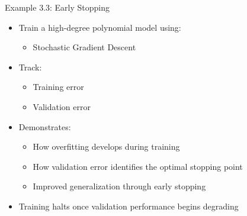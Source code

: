 \documentclass[aspectratio=169]{beamer}
\begin{document}
\begin{frame}{Example 3.3: Early Stopping}
	
	\begin{itemize}
		\item Train a high-degree polynomial model using:
		\begin{itemize}
			\item Stochastic Gradient Descent
		\end{itemize}
		
		\vspace{0.5em}
		
		\item Track:
		\begin{itemize}
			\item Training error
			\item Validation error
		\end{itemize}
		
		\vspace{0.5em}
		
		\item Demonstrates:
		\begin{itemize}
			\item How overfitting develops during training
			\item How validation error identifies the optimal stopping point
			\item Improved generalization through early stopping
		\end{itemize}
		
		\vspace{0.5em}
		
		\item Training halts once validation performance begins degrading
	\end{itemize}
	
\end{frame}
\end{document}
